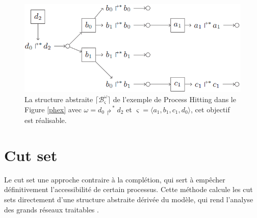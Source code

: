 \documentclass[11pt]{report}
\theoremstyle{definition}
\begin{document}
\begin{figure}[ht]
\centering
\includegraphics[scale=0.6]{underapp.png}
\caption{La structure abstraite $\lceil\mathcal{B}^\omega_\varsigma\rceil$ de l'exemple de Process Hitting dans le Figure \ref{phex} avec $\omega=d_0\Rsh^*d_2$ et $\varsigma=\langle a_1,b_1,c_1,d_0\rangle$, cet objectif est r\'ealisable.}
\end{figure}
\section{Cut set}
Le cut set une approche contraire \`a la compl\'etion, qui sert \`a emp\^echer d\'efinitivement l'accessibilit\'e de certain processus. Cette m\'ethode calcule les cut sets directement d'une structure abstraite d\'eriv\'ee du mod\`ele, qui rend l'analyse des grands r\'eseaux traitables \citep{Pauleve2013}.
\end{document}
